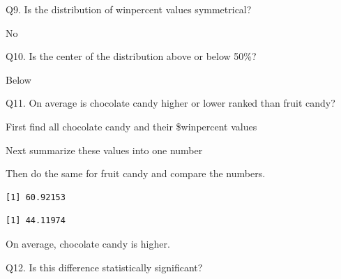 \documentclass[
  letterpaper,
  DIV=11,
  numbers=noendperiod]{scrartcl}
\newenvironment{Shaded}{\begin{snugshade}}{\end{snugshade}}
\newcommand{\FunctionTok}[1]{\textcolor[rgb]{0.28,0.35,0.67}{#1}}
\newcommand{\NormalTok}[1]{\textcolor[rgb]{0.00,0.23,0.31}{#1}}
\newcommand{\SpecialCharTok}[1]{\textcolor[rgb]{0.37,0.37,0.37}{#1}}
\begin{document}
Q9. Is the distribution of winpercent values symmetrical?

No

Q10. Is the center of the distribution above or below 50\%?

Below

Q11. On average is chocolate candy higher or lower ranked than fruit
candy?

First find all chocolate candy and their \$winpercent values

Next summarize these values into one number

Then do the same for fruit candy and compare the numbers.

\begin{Shaded}
\end{Shaded}

\begin{verbatim}
[1] 60.92153
\end{verbatim}

\begin{Shaded}
\end{Shaded}

\begin{verbatim}
[1] 44.11974
\end{verbatim}

On average, chocolate candy is higher.

Q12. Is this difference statistically significant?

\begin{Shaded}
\end{Shaded}
\end{document}
